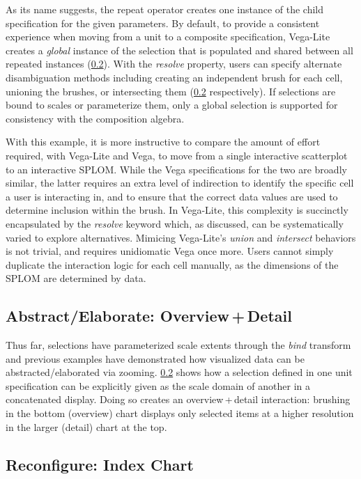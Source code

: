 As its name suggests, the repeat operator creates one instance of the child
specification for the given parameters. By default, to provide a consistent
experience when moving from a unit to a composite specification, Vega-Lite
creates a \emph{global} instance of the selection that is populated and shared
between all repeated instances (\cref{}). With the
\emph{resolve} property, users can specify alternate disambiguation methods
including creating an independent brush for each cell, unioning the brushes, or
intersecting them (\cref{} respectively). If
selections are bound to scales or parameterize them, only a global selection is
supported for consistency with the composition algebra.

With this example, it is more instructive to compare the amount of effort
required, with Vega-Lite and Vega, to move from a single interactive scatterplot
to an interactive SPLOM. While the Vega specifications for the two are broadly
similar, the latter requires an extra level of indirection to identify the
specific cell a user is interacting in, and to ensure that the correct data
values are used to determine inclusion within the brush. In Vega-Lite, this
complexity is succinctly encapsulated by the \emph{resolve} keyword which, as
discussed, can be systematically varied to explore alternatives. Mimicing
Vega-Lite's \emph{union} and \emph{intersect} behaviors is not trivial, and
requires unidiomatic Vega once more. Users cannot simply duplicate the
interaction logic for each cell manually, as the dimensions of the SPLOM are
determined by data.

\subsection{Abstract/Elaborate: Overview\,+\,Detail}

Thus far, selections have parameterized scale extents through the \emph{bind}
transform and previous examples have demonstrated how visualized data can be
abstracted/elaborated via zooming. \cref{} shows how a
selection defined in one unit specification can be explicitly given as the scale
domain of another in a concatenated display. Doing so creates an
overview\,+\,detail interaction: brushing in the bottom (overview) chart
displays only selected items at a higher resolution in the larger (detail) chart
at the top.

\subsection{Reconfigure: Index Chart}

